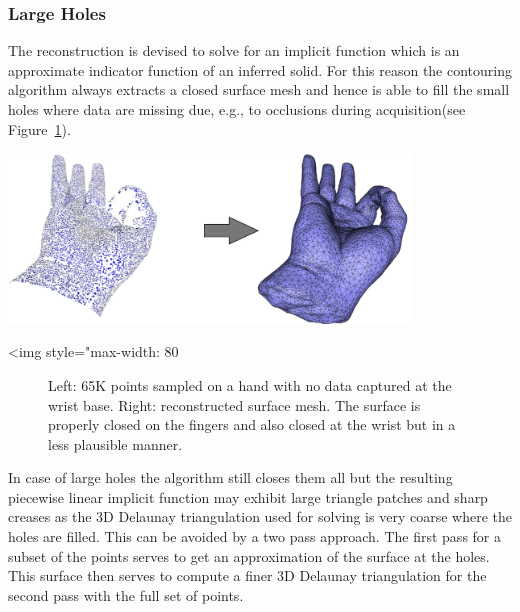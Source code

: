 \subsubsection{Large Holes}

The reconstruction is devised to solve for an implicit function which is an approximate indicator function of an inferred solid. For this reason the contouring algorithm always extracts a closed surface mesh and hence is able to fill the small holes where data are missing due, e.g., to occlusions during acquisition(see Figure~\ref{Surface_reconstruction_points_3-fig-holes_bad}).

\begin{center}
    \begin{ccTexOnly}
        \includegraphics[width=0.8\textwidth]{Surface_reconstruction_points_3/holes_bad}
    \end{ccTexOnly}
    \begin{ccHtmlOnly}
        <img style="max-width: 80%
    \end{ccHtmlOnly}
    \begin{figure}[h]
        \caption{Left: 65K points sampled on a hand with no data
                 captured at the wrist base.
                 Right: reconstructed surface mesh. The surface is
                 properly closed on the fingers and also closed
                 at the wrist but in a less plausible manner.}
        \label{Surface_reconstruction_points_3-fig-holes_bad}
    \end{figure}
\end{center}

 In case of large holes the algorithm still closes them all but the resulting piecewise linear implicit function may exhibit large triangle patches and sharp creases as the 3D Delaunay triangulation used for solving is very coarse where the holes are filled. This can be avoided by a two pass approach. The first pass for a subset of the points serves to get an approximation of the surface at the holes. This surface then serves to compute a finer 3D Delaunay triangulation for the second pass with the full set of points.

